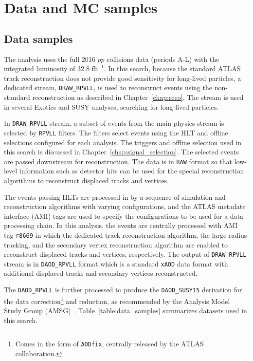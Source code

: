 \chapter{Data and MC samples}
\label{chap:data_mc}

\section{Data samples}
\label{sec:data_mc:data}

The analysis uses the full 2016 $pp$ collisions data (periods A-L) with the integrated luminosity of 32.8 $\mathrm{fb^{-1}}$. In this search, because the standard ATLAS track reconstruction does not provide good sensitivity for long-lived particles, a dedicated stream, \texttt{DRAW\_RPVLL}, is used to reconstruct events using the non-standard reconstruction as described in Chapter~\ref{chap:reco}. The stream is used in several Exotics and SUSY analyses, searching for long-lived particles. %

In \texttt{DRAW\_RPVLL} stream, a subset of events from the main physics stream is selected by \texttt{RPVLL} filters. The filters select events using the HLT and offline selections configured for each analysis. The triggers and offline selection used in this search is discussed in Chapter~\ref{chap:signal_selection}. The selected events are passed downstream for reconstruction. The data is in \texttt{RAW} format so that low-level information such as detector hits can be used for the special reconstruction algorithms to reconstruct displaced tracks and vertices.

The events passing HLTs are processed in by a sequence of simulation and reconstruction algorithms with varying configurations, and the ATLAS metadate interface (AMI) tags are used to specify the configurations to be used for a data processing chain. In this analysis, the events are centrally processed with AMI tag \texttt{r8669} in which the dedicated track reconstruction algorithm, the large radius tracking, and the secondary vertex reconstruction algorithm are enabled to reconstruct displaced tracks and vertices, respectively. The output of \texttt{DRAW\_RPVLL} stream is in \texttt{DAOD\_RPVLL} format which is a standard \texttt{xAOD} data format with additional displaced tracks and secondary vertices reconstructed. 

The \texttt{DAOD\_RPVLL} is further processed to produce the \texttt{DAOD\_SUSY15} derivation for the data correction\footnote{Comes in the form of \texttt{AODfix}, centrally released by the ATLAS collaboration.} and reduction, as recommended by the Analysis Model Study Group (AMSG)~\cite{Catmore:1543445}. Table~\ref{table:data_samples} summarizes datasets used in this search.

